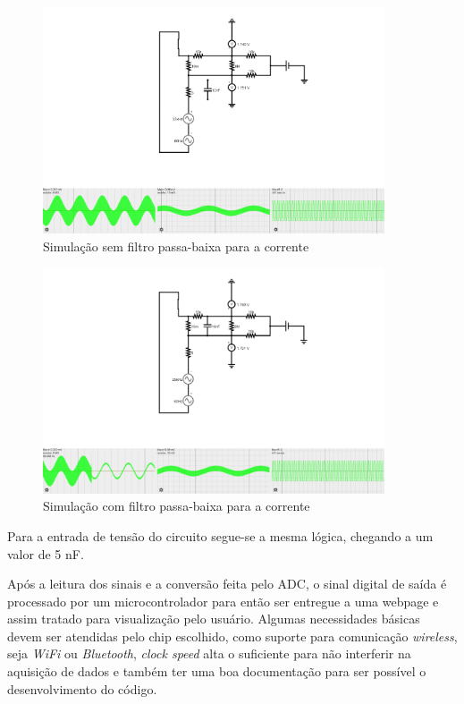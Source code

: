 \begin{figure}[htb!]
    \caption{Simulação sem filtro passa-baixa para a corrente}
    \label{fig:simco1}
    \includegraphics[width=0.9\textwidth]{figuras/sim-co-1.png}
    \fonte{}
\end{figure}

\begin{figure}[htb!]
    \caption{Simulação com filtro passa-baixa para a corrente}
    \label{fig:simco2}
    \includegraphics[width=0.9\textwidth]{figuras/sim-co-2.png}
    \fonte{}
\end{figure}

Para a entrada de tensão do circuito segue-se a mesma lógica, chegando a um valor de 5 nF.

Após a leitura dos sinais e a conversão feita pelo ADC, o sinal digital de saída é processado por um microcontrolador para então ser entregue a uma webpage e assim tratado para visualização pelo usuário. Algumas necessidades básicas devem ser atendidas pelo chip escolhido, como suporte para comunicação \textit{wireless}, seja \textit{WiFi} ou \textit{Bluetooth}, \textit{clock speed} alta o suficiente para não interferir na aquisição de dados e também ter uma boa documentação para ser possível o desenvolvimento do código.

